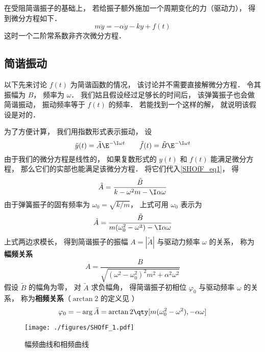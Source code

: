 

在受阻简谐振子的基础上， 若给振子额外施加一个周期变化的力（驱动力）， 得到微分方程如下．
\begin{equation}\label{SHOfF_eq1}
m\ddot y = -\alpha \dot y - ky + f(t)
\end{equation}
这时一个二阶常系数非齐次微分方程．

\subsection{简谐振动}
以下先来讨论 $f(t)$ 为简谐函数的情况， 该讨论并不需要直接解微分方程． 令其振幅为 $B$， 频率为 $\omega$． 我们姑且假设经过足够长的时间后， 该弹簧振子也会做简谐振动， 振动频率等于 $f(t)$ 的频率． 若能找到一个这样的解， 就说明该假设是对的．

为了方便计算， 我们用指数形式表示振动， 设
\begin{equation}
\tilde y(t) = \tilde A\E^{-\I\omega t} \qquad
\tilde f(t) = \tilde B\E^{-\I \omega t}
\end{equation}
由于我们的微分方程是线性的， 如果复数形式的 $y(t)$ 和 $f(t)$ 能满足微分方程， 那么它们的实部也能满足该微分方程． 将它们代入\autoref{SHOfF_eq1}， 得
\begin{equation}
\tilde A =  \frac{\tilde B}{k -\omega^2 m - \I\alpha\omega}
\end{equation}
由于弹簧振子的固有频率为 $\omega_0 = \sqrt{k/m}$， 上式可用 $\omega_0$ 表示为
\begin{equation}
\tilde A = \frac{\tilde B}{m(\omega_0^2 - \omega^2) - \I\alpha\omega}
\end{equation}
上式两边求模长， 得到简谐振子的振幅 $A = |\tilde A|$ 与驱动力频率 $\omega$ 的关系， 称为\textbf{幅频关系}
\begin{equation}\label{SHOfF_eq5}
A = \frac{B}{\sqrt{(\omega^2 - \omega_0^2)^2 m^2 + \alpha^2\omega^2}}
\end{equation}
假设 $\tilde B$ 的幅角为零， 对 $\tilde A$ 求负幅角， 得简谐振子初相位 $\varphi_0$ 与驱动频率 $\omega$ 的关系， 称为\textbf{相频关系}（$\arctan2$ 的定义见%
）
\begin{equation}\label{SHOfF_eq6}
\varphi_0 = -\arg \tilde A = \arctan2 \qty[m(\omega_0^2 - \omega^2), -\alpha\omega]
\end{equation}

\begin{figure}[ht]
\centering
\texttt{[image: ./figures/SHOfF\_1.pdf]}
\caption{幅频曲线和相频曲线} \label{SHOfF_fig1}
\end{figure}

